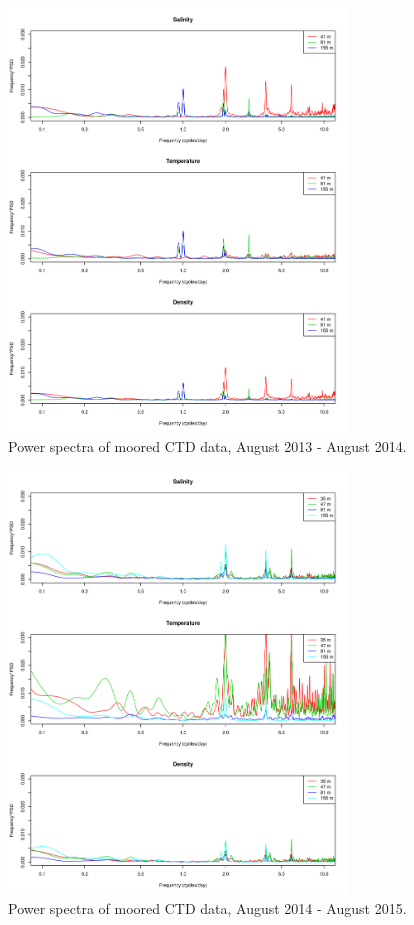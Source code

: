 \documentclass[12pt]{dforeport}
\begin{document}
\begin{figure}
\centering
\includegraphics[width = 0.8\textwidth]{./figures/12_mctd_ps_2013_2014.png}
\caption[Power spectra of moored CTD, 2013-2014]{Power spectra of moored CTD data, August 2013 - August 2014.}
\label{f:mctd_ps_2013_2014}
\end{figure}

\begin{figure}
\centering
\includegraphics[width = 0.8\textwidth]{./figures/13_mctd_ps_2014_2015.png}
\caption[Power spectra of moored CTD, 2014-2015]{Power spectra of moored CTD data, August 2014 - August 2015.}
\label{f:mctd_ps_2014_2015}
\end{figure}
\end{document}
